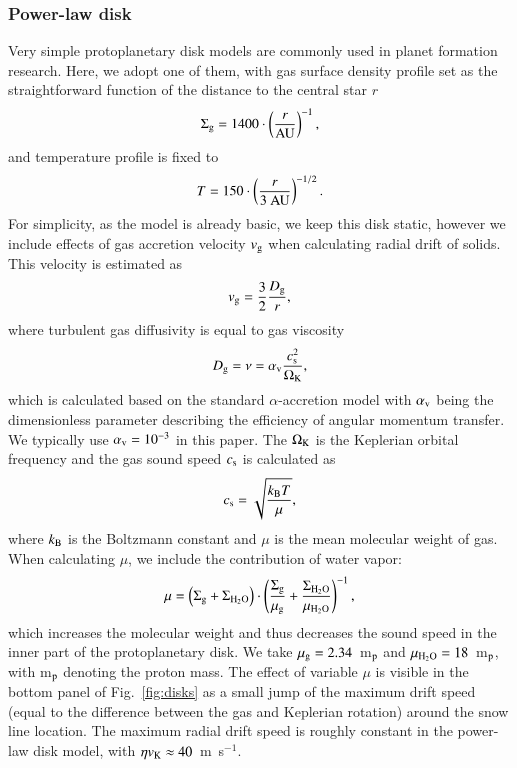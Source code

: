 \documentclass{aa}
\begin{document}
\subsubsection{Power-law disk}

Very simple protoplanetary disk models are commonly used in planet formation research. Here, we adopt one of them, with gas surface density profile set as
the straightforward function of the distance to the central star $r$
\begin{equation}
{\Sigma_{\rm g}} = 1400 \cdot \left(\frac{r}{\rm AU}\right)^{-1},
\end{equation}
and temperature profile is fixed to
\begin{equation}
{T} = 150 \cdot \left(\frac{r}{3~{\rm AU}}\right)^{-1/2}.
\end{equation}
For simplicity, as the model is already basic, we keep this disk static, however we include effects of gas accretion velocity $v_{\rm g}$ when calculating radial drift of solids. This velocity is estimated as 
\begin{equation}\label{vgas}
v_{\rm g} = \frac{3}{2}\frac{D_{\rm g}}{r},
\end{equation}
where turbulent gas diffusivity is equal to gas viscosity
\begin{equation}
D_{\rm g} = \nu = \alpha_{\rm v} \frac{c_{\rm s}^2}{\Omega_{\rm K}},
\end{equation}
which is calculated based on the standard $\alpha$-accretion model \citep{1973A&A....24..337S} with $\alpha_{\rm v}$ being the dimensionless parameter describing the efficiency of angular momentum transfer. We typically use $\alpha_{\rm v}=10^{-3}$ in this paper. The $\Omega_{\rm K}$ is the Keplerian orbital frequency and the gas sound speed $c_{\rm s}$ is calculated as
\begin{equation}
c_{\rm s} = \sqrt{\frac{k_{\rm B}T}{\mu}},
\end{equation}
where $k_{\rm B}$ is the Boltzmann constant and $\mu$ is the mean molecular weight of gas. When calculating $\mu$, we include the contribution of water vapor:
\begin{equation}
\mu = \left(\Sigma_{\rm g}+\Sigma_{\rm H_2O}\right)\cdot\left({\frac{\Sigma_{\rm g}}{\mu_{\rm g}}+\frac{\Sigma_{\rm H_2O}}{\mu_{\rm H_2O}}}\right)^{-1},
\end{equation}
which increases the molecular weight and thus decreases the sound speed in the inner part of the protoplanetary disk. We take $\mu_{\rm g}=2.34$~m$_{\rm p}$ and $\mu_{\rm H_2O}=18$~m$_{\rm p}$, with m$_{\rm p}$ denoting the proton mass. The effect of variable $\mu$ is visible in the bottom panel of Fig.~\ref{fig:disks} as a small jump of the maximum drift speed (equal to the difference between the gas and Keplerian rotation) around the snow line location. The maximum radial drift speed is roughly constant in the power-law disk model, with $\eta v_{\rm K} \approx 40$~m~s$^{-1}$.
\end{document}
